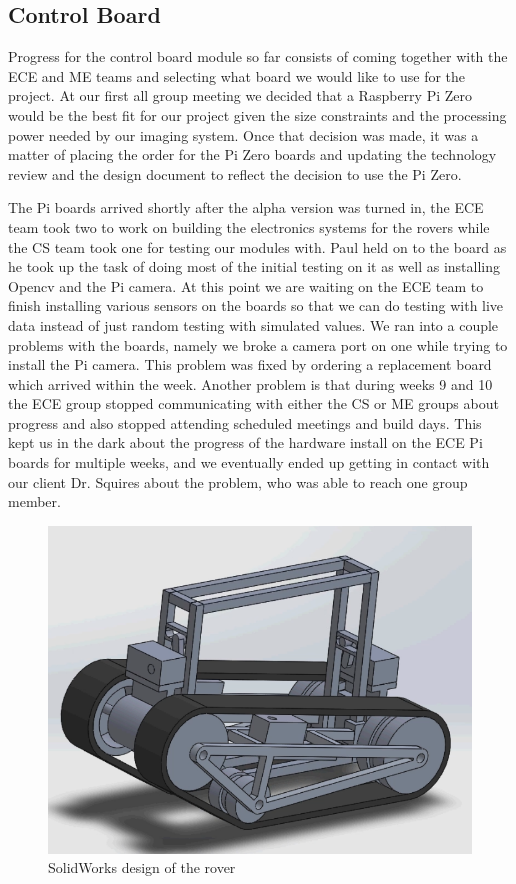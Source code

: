 \documentclass[10pt,letterpaper,onecolumn,draftclsnofoot,journal]{IEEEtran}
\begin{document}
\subsection{Control Board}
Progress for the control board module so far consists of coming together with the ECE and ME teams and selecting what board we would like to use for the project. At our first all group meeting we decided that a Raspberry Pi Zero would be the best fit for our project given the size constraints and the processing power needed by our imaging system. Once that decision was made, it was a matter of placing the order for the Pi Zero boards and updating the technology review and the design document to reflect the decision to use the Pi Zero.
\par
The Pi boards arrived shortly after the alpha version was turned in, the ECE team took two to work on building the electronics systems for the rovers while the CS team took one for testing our modules with. Paul held on to the board as he took up the task of doing most of the initial testing on it as well as installing Opencv and the Pi camera. At this point we are waiting on the ECE team to finish installing various sensors on the boards so that we can do testing with live data instead of just random testing with simulated values. We ran into a couple problems with the boards, namely we broke a camera port on one while trying to install the Pi camera. This problem was fixed by ordering a replacement board which arrived within the week. Another problem is that during weeks 9 and 10 the ECE group stopped communicating with either the CS or ME groups about progress and also stopped attending scheduled meetings and build days. This kept us in the dark about the progress of the hardware install on the ECE Pi boards for multiple weeks, and we eventually ended up getting in contact with our client Dr. Squires about the problem, who was able to reach one group member.
\begin{figure}[H]
	\centering
	\includegraphics[scale = .4]{Capture.PNG}
	\caption{SolidWorks design of the rover}
	\label{fig:design}
\end{figure}
\end{document}
